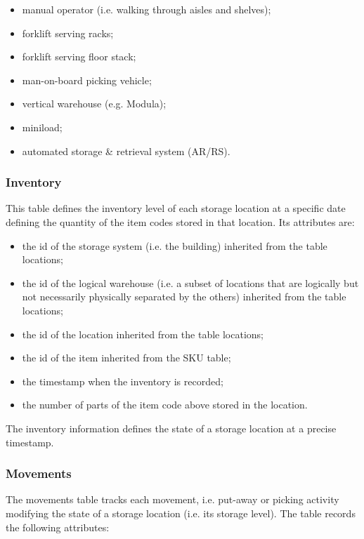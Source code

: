 \begin{itemize}
    \item manual operator (i.e. walking through aisles and shelves);
    \item forklift serving racks;
    \item forklift serving floor stack;
    \item man-on-board picking vehicle;
    \item vertical warehouse (e.g. Modula);
    \item miniload;
    \item automated storage \& retrieval system (AR/RS).

\end{itemize}

\subsubsection{Inventory}
This table defines the inventory level of each storage location at a specific date defining the quantity of the item codes stored in that location. Its attributes are:

\begin{itemize}
    \item the id of the storage system (i.e. the building) inherited from the table locations;
    \item the id of the logical warehouse (i.e. a subset of locations that are logically but not necessarily physically separated by the others) inherited from the table locations;
    \item the id of the location inherited from the table locations;
    \item the id of the item inherited from the SKU table;
    \item the timestamp when the inventory is recorded;
    \item the number of parts of the item code above stored in the location.

\end{itemize}

The inventory information defines the state of a storage location at a precise timestamp.

\subsubsection{Movements}
The movements table tracks each movement, i.e. put-away or picking activity modifying the state of a storage location (i.e. its storage level). The table records the following attributes:

